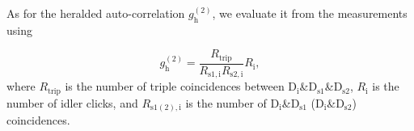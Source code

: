 \documentclass[%
 reprint,
 amsmath,amssymb,
 aps,
 pra,
]{revtex4-1}
\begin{document}
As for the heralded auto-correlation $g^{(2)}_\mathrm{h}$, we evaluate it from the measurements using

\begin{equation}
g^{(2)}_\mathrm{h}=\frac{R_\mathrm{trip}}{R_\mathrm{s1,i}R_\mathrm{s2,i}}R_\mathrm{i},
\end{equation}
where $R_\mathrm{trip}$ is the number of triple coincidences between $\mathrm{D_{i}}$\&$\mathrm{D_{s1}}$\&$\mathrm{D_{s2}}$, $R_\mathrm{i}$ is the number of idler clicks, and $R_\mathrm{s1(2),i}$ is the number of $\mathrm{D_{i}}$\&$\mathrm{D_{s1}}$ ($\mathrm{D_{i}}$\&$\mathrm{D_{s2}}$) coincidences.
\end{document}
